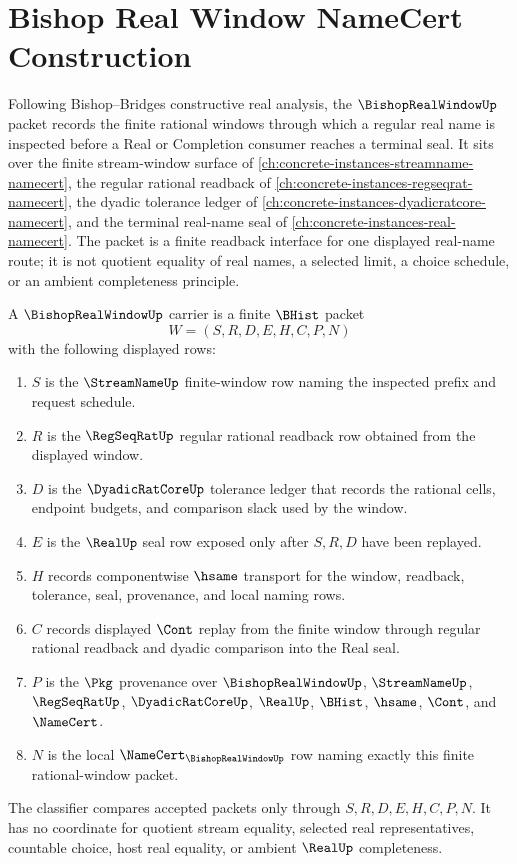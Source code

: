 \chapter{Bishop Real Window NameCert Construction}
\label{ch:concrete-instances-bishop-real-window-namecert}

Following Bishop--Bridges constructive real analysis, the $\BishopRealWindowUp$ packet records the finite rational windows through which a regular real name is inspected before a Real or Completion consumer reaches a terminal seal. It sits over the finite stream-window surface of \autoref{ch:concrete-instances-streamname-namecert}, the regular rational readback of \autoref{ch:concrete-instances-regseqrat-namecert}, the dyadic tolerance ledger of \autoref{ch:concrete-instances-dyadicratcore-namecert}, and the terminal real-name seal of \autoref{ch:concrete-instances-real-namecert}. The packet is a finite readback interface for one displayed real-name route; it is not quotient equality of real names, a selected limit, a choice schedule, or an ambient completeness principle.

\begin{definition}
\label{def:bishop-real-window-carrier}
A $\BishopRealWindowUp$ carrier is a finite $\BHist$ packet
$$
W=(S,R,D,E,H,C,P,N)
$$
with the following displayed rows:
\begin{enumerate}
\item $S$ is the $\StreamNameUp$ finite-window row naming the inspected prefix and request schedule.
\item $R$ is the $\RegSeqRatUp$ regular rational readback row obtained from the displayed window.
\item $D$ is the $\DyadicRatCoreUp$ tolerance ledger that records the rational cells, endpoint budgets, and comparison slack used by the window.
\item $E$ is the $\RealUp$ seal row exposed only after $S,R,D$ have been replayed.
\item $H$ records componentwise $\hsame$ transport for the window, readback, tolerance, seal, provenance, and local naming rows.
\item $C$ records displayed $\Cont$ replay from the finite window through regular rational readback and dyadic comparison into the Real seal.
\item $P$ is the $\Pkg$ provenance over $\BishopRealWindowUp$, $\StreamNameUp$, $\RegSeqRatUp$, $\DyadicRatCoreUp$, $\RealUp$, $\BHist$, $\hsame$, $\Cont$, and $\NameCert$.
\item $N$ is the local $\NameCert_{\BishopRealWindowUp}$ row naming exactly this finite rational-window packet.
\end{enumerate}
The classifier compares accepted packets only through $S,R,D,E,H,C,P,N$. It has no coordinate for quotient stream equality, selected real representatives, countable choice, host real equality, or ambient $\RealUp$ completeness.
\end{definition}

